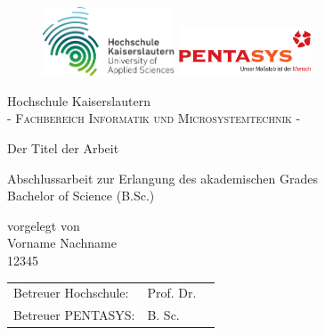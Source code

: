 \pagestyle{empty} %

\begin{figure}[t]
	\centering
	\includegraphics[width=0.35\textwidth]{Abb/hs-logo} \hspace{2cm}
	\includegraphics[width=0.35\textwidth]{Abb/pentasys_logo}
\end{figure}


\begin{center}
\Large Hochschule Kaiserslautern \\
\normalsize \textsc{- Fachbereich Informatik und Microsystemtechnik -} \\

\vspace{105 pt}

\Huge Der Titel der Arbeit \\ 
\normalsize
\vspace{20 pt}

Abschlussarbeit zur Erlangung des akademischen Grades \\ 
Bachelor of Science (B.Sc.) 

\vspace{75 pt}


vorgelegt von \\
\vspace{5 pt}
Vorname Nachname \\
12345
\vspace{115 pt}

\begin{tabular}[h]{p{4cm}l l}
	Betreuer Hochschule: & Prof. Dr. \\
	Betreuer PENTASYS: & B. Sc. 
\end{tabular}


\end{center}
